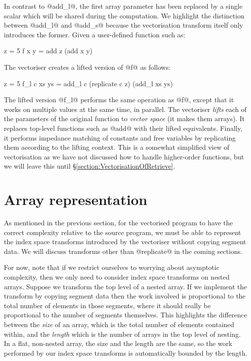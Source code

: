 In contrast to @add_l@, the first array parameter has been replaced by a single scalar which will be shared during the computation. We highlight the distinction between @add_l@ and @add_s@ because the vectorisation transform itself only introduces the former. Given a user-defined function such as:
\begin{code}
 z           = 5
 f x y       = add z (add x y)
\end{code}

\noindent
The vectoriser creates a lifted version of @f@ as follows:
\begin{code}
 z           = 5
 f_l c xs ys = add_l c (replicate c z) (add_l xs ys)
\end{code}

The lifted version @f_l@ performs the same operation as @f@, except that it works on multiple values at the same time, in parallel. The vectoriser \emph{lifts} each of the parameters of the original function to \emph{vector space} (it makes them arrays). It replaces top-level functions such as @add@ with their lifted equivalents. Finally, it performs impedance matching of constants and free variables by replicating them according to the lifting context. This is a somewhat simplified view of vectorisation as we have not discussed how to handle higher-order functions, but we will leave this until \S\ref{section:VectorisationOfRetrieve}.


\clearpage{}
\section{Array representation}
As mentioned in the previous section, for the vectorised program to have the correct complexity relative to the source program, we must be able to represent the index space transforms introduced by the vectoriser without copying segment data. We will discuss transforms other than @replicate@ in the coming sections.

For now, note that if we restrict ourselves to worrying about asymptotic complexity, then we only need to consider index space transforms on nested arrays. Suppose we transform the top level of a nested array. If we implement the transform by copying segment data then the work involved is proportional to the total number of elements in those segments, where it should really be proportional to the number of segments themselves. This highlights the difference between the \emph{size} of an array, which is the total number of elements contained within, and the \emph{length} which is the number of arrays in the top level of nesting. In a flat, non-nested array, the size and the length are the same, so the work performed by our index space transforms is automatically bounded by the length.

